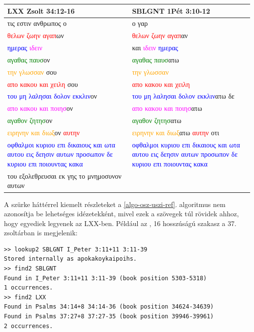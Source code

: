 \documentclass{article}
\newcommand\gr{\selectlanguage{greek}\frenchspacing}
\newcommand\hu{\selectlanguage{magyar}\frenchspacing}
\begin{document}
\begin{center}
\begin{tabular}{p{5cm} p{5cm}}
LXX Zsolt 34:12-16 & SBLGNT 1Pét 3:10-12\\
\hline
{\gr τις εστιν ανθρωπος ο} &
{\gr ο γαρ}\\
{\gr \textcolor{red}{θελων ζωην αγαπ}ων} & %
{\gr \textcolor{red}{θελων ζωην αγαπ}αν}\\ %
{\gr \colorbox{light-gray}{\textcolor{blue}{ημερας}} \colorbox{light-gray}{\textcolor{magenta}{ιδειν}}} &
{\gr και \colorbox{light-gray}{\textcolor{magenta}{ιδειν}} \colorbox{light-gray}{\textcolor{blue}{ημερας}}}\\
{\gr \textcolor{green}{αγαθας παυσ}ον}& %
{\gr \textcolor{green}{αγαθας παυσ}ατω}\\ %
{\gr \colorbox{light-gray}{\textcolor{orange}{την γλωσσαν}} σου}&
{\gr \colorbox{light-gray}{\textcolor{orange}{την γλωσσαν}}}\\
{\gr \textcolor{red}{απο κακου και χειλη} σου}& %
{\gr \textcolor{red}{απο κακου και χειλη}}\\ %
{\gr \textcolor{blue}{του μη λαλησαι δολον εκκλιν}ον}& %
{\gr \textcolor{blue}{του μη λαλησαι δολον εκκλιν}ατω δε}\\ %
{\gr \colorbox{light-gray}{\textcolor{magenta}{απο κακου και ποιησ}}ον}&
{\gr \colorbox{light-gray}{\textcolor{magenta}{απο κακου και ποιησ}}ατω}\\
{\gr \textcolor{green}{αγαθον ζητησ}ον}& %
{\gr \textcolor{green}{αγαθον ζητησ}ατω}\\ %
{\gr \textcolor{orange}{ειρηνην και διωξ}ον \colorbox{light-gray}{\textcolor{red}{αυτην}}}& %
{\gr \textcolor{orange}{ειρηνην και διωξ}ατω \colorbox{light-gray}{\textcolor{red}{αυτην}} οτι}\\ %
{\gr \textcolor{blue}{οφθαλμοι κυριου επι δικαιους και ωτα αυτου εις δεησιν αυτων \hfill\break προσωπον δε κυριου επι ποιουντας κακα}}& %
{\gr \textcolor{blue}{οφθαλμοι κυριου επι δικαιους και ωτα αυτου εις δεησιν αυτων \hfill\break προσωπον δε κυριου επι ποιουντας κακα}}\\ %
{\gr του εξολεθρευσαι εκ γης το \hfill\break μνημοσυνον αυτων}&
\end{tabular}
\end{center}
\hu
A szürke háttérrel kiemelt részleteket a \ref{algo-osz-uszi-ref}. algoritmus nem azonosítja be
lehetséges idézetekként, mivel ezek a szövegek túl rövidek ahhoz, hogy egyediek legyenek az LXX-ben.
Például az {\gr {απο κακου και ποιησ$\ldots$}}, 16 hosszúságú szakasz a 37. zsoltárban is megjelenik:
\begin{lstlisting}
>> lookup2 SBLGNT I_Peter 3:11+11 3:11-39
Stored internally as apokakoykaipoihs.
>> find2 SBLGNT
Found in I_Peter 3:11+11 3:11-39 (book position 5303-5318)
1 occurrences.
>> find2 LXX
Found in Psalms 34:14+8 34:14-36 (book position 34624-34639)
Found in Psalms 37:27+8 37:27-35 (book position 39946-39961)
2 occurrences.
\end{lstlisting}
\end{document}
